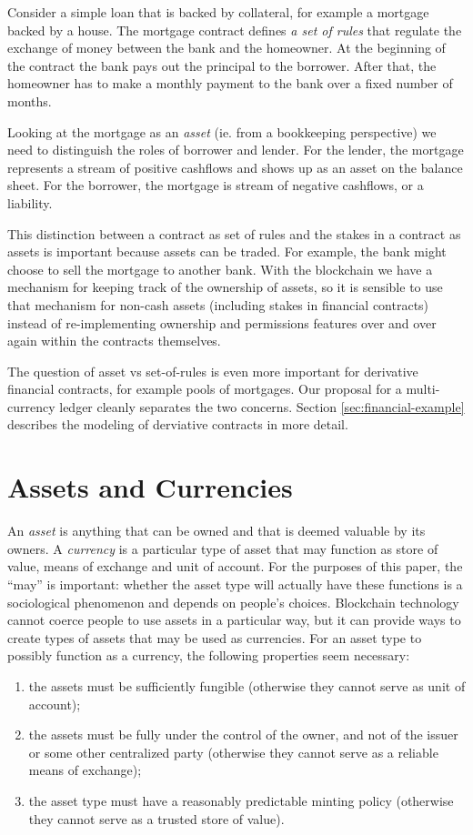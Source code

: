 \documentclass{llncs}
\begin{document}
Consider a simple loan that is backed by collateral, for example a mortgage backed by a house. The mortgage contract defines \emph{a set of rules} that regulate the exchange of money between the bank and the homeowner. At the beginning of the contract the bank pays out the principal to the borrower. After that, the homeowner has to make a monthly payment to the bank over a fixed number of months.

Looking at the mortgage as an \emph{asset} (ie. from a bookkeeping perspective) we need to distinguish the roles of borrower and lender. For the lender, the mortgage represents a stream of positive cashflows and shows up as an asset on the balance sheet. For the borrower, the mortgage is stream of negative cashflows, or a liability.

This distinction between a contract as set of rules and the stakes in a contract as assets is important because assets can be traded. For example, the bank might choose to sell the mortgage to another bank. With the blockchain we have a mechanism for keeping track of the ownership of assets, so it is sensible to use that mechanism for non-cash assets (including stakes in financial contracts) instead of re-implementing ownership and permissions features over and over again within the contracts themselves.

The question of asset vs set-of-rules is even more important for derivative financial contracts, for example pools of mortgages. Our proposal for a multi-currency ledger cleanly separates the two concerns. Section \ref{sec:financial-example} describes the modeling of derviative contracts in more detail.

\section{Assets and Currencies}
\label{sec:Preliminaries}

An \emph{asset} is anything that can be owned and that is deemed valuable by its owners. A \emph{currency} is a particular type of asset that may function as store of value, means of exchange and unit of account. For the purposes of this paper, the ``may'' is important: whether the asset type will actually have these functions is a sociological phenomenon and depends on people's choices. Blockchain technology cannot coerce people to use assets in a particular way, but it can provide ways to create types of assets that may be used as currencies. For an asset type to possibly function as a currency, the following properties seem necessary:
\begin{enumerate}
\item the assets must be sufficiently fungible (otherwise they cannot serve as unit of account);
\item the assets must be fully under the control of the owner, and not of the issuer or some other centralized party (otherwise they cannot serve as a reliable means of exchange);
\item the asset type must have a reasonably predictable minting policy (otherwise they cannot serve as a trusted store of value).
\end{enumerate}
\end{document}
